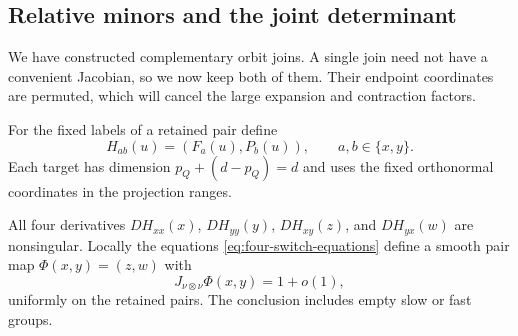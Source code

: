 \subsection{Relative minors and the joint determinant}

We have constructed complementary orbit joins.  A single join need not
have a convenient Jacobian, so we now keep both of them.  Their endpoint
coordinates are permuted, which will cancel the large expansion and
contraction factors.

For the fixed labels of a retained pair define
\begin{equation}\label{eq:joint-endpoint-map}
 H_{ab}(u)=(F_a(u),P_b(u)),\qquad a,b\in\{x,y\}.
\end{equation}
Each target has dimension $p_Q+(d-p_Q)=d$ and uses the fixed
orthonormal coordinates in the projection ranges.

\begin{lemma}\label{lem:switch-jacobian}
All four derivatives $DH_{xx}(x)$, $DH_{yy}(y)$,
$DH_{xy}(z)$, and $DH_{yx}(w)$ are nonsingular.  Locally the equations
\eqref{eq:four-switch-equations} define a smooth pair map
$\Phi(x,y)=(z,w)$ with
\begin{equation}\label{eq:pair-jacobian}
 J_{\nu\otimes\nu}\Phi(x,y)=1+o(1),
\end{equation}
uniformly on the retained pairs.  The conclusion includes empty slow
or fast groups.
\end{lemma}

